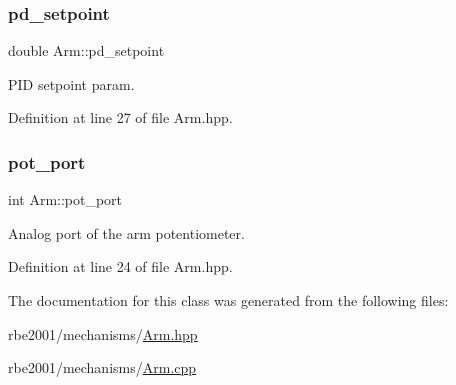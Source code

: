 \subsubsection{\texorpdfstring{pd\+\_\+setpoint}{pd\_setpoint}}
{\footnotesize\ttfamily double Arm\+::pd\+\_\+setpoint\hspace{0.3cm}{\ttfamily [private]}}



P\+ID setpoint param. 



Definition at line 27 of file Arm.\+hpp.

\mbox{\label{class_arm_a6e384005fe53340f168ad5708302231a}} 
\subsubsection{\texorpdfstring{pot\+\_\+port}{pot\_port}}
{\footnotesize\ttfamily int Arm\+::pot\+\_\+port\hspace{0.3cm}{\ttfamily [private]}}



Analog port of the arm potentiometer. 



Definition at line 24 of file Arm.\+hpp.



The documentation for this class was generated from the following files\+:\begin{DoxyCompactItemize}
\item 
rbe2001/mechanisms/\hyperlink{_arm_8hpp}{Arm.\+hpp}\item 
rbe2001/mechanisms/\hyperlink{_arm_8cpp}{Arm.\+cpp}\end{DoxyCompactItemize}
